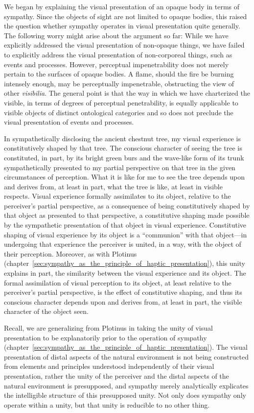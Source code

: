 We began by explaining the visual presentation of an opaque body in terms of sympathy. Since the objects of sight are not limited to opaque bodies, this raised the question whether sympathy operates in visual presentation quite generally. The following worry might arise about the argument so far: While we have explicitly addressed the visual presentation of non-opaque things, we have failed to explicitly address the visual presentation of non-corporeal things, such as events and processes. However, perceptual impenetrability does not merely pertain to the surfaces of opaque bodies. A flame, should the fire be burning intensely enough, may be perceptually impenetrable, obstructing the view of other \emph{visibilia}. The general point is that the way in which we have charterized the visible, in terms of degrees of perceptual penetrability, is equally applicable to visible objects of distinct ontological categories and so does not preclude the visual presentation of events and processes.

In sympathetically disclosing the ancient chestnut tree, my visual experience is constitutively shaped by that tree. The conscious character of seeing the tree is constituted, in part, by its bright green burs and the wave-like form of its trunk sympathetically presented to my partial perspective on that tree in the given circumstances of perception. What it is like for me to see the tree depends upon and derives from, at least in part, what the tree is like, at least in visible respects. Visual experience formally assimilates to its object, relative to the perceiver's partial perspective, as a consequence of being constitutively shaped by that object as presented to that perspective, a constitutive shaping made possible by the sympathetic presentation of that object in visual experience. Constitutive shaping of visual experience by its object is a ``communion'' with that object---in undergoing that experience the perceiver is united, in a way, with the object of their perception. Moreover, as with Plotinus (chapter~\ref{sec:sympathy_as_the_principle_of_haptic_presentation}), this unity explains in part, the similarity between the visual experience and its object. The formal assimilation of visual perception to its object, at least relative to the perceiver's partial perspective, is the effect of constitutive shaping, and thus its conscious character depends upon and derives from, at least in part, the visible character of the object seen.

Recall, we are generalizing from Plotinus in taking the unity of visual presentation to be explanatorily prior to the operation of sympathy (chapter~\ref{sec:sympathy_as_the_principle_of_haptic_presentation}). The visual presentation of distal aspects of the natural environment is not being constructed from elements and principles understood independently of their visual presentation, rather the unity of the perceiver and the distal aspects of the natural environment is presupposed, and sympathy merely analytically explicates the intelligible structure of this presupposed unity. Not only does sympathy only operate within a unity, but that unity is reducible to no other thing.

